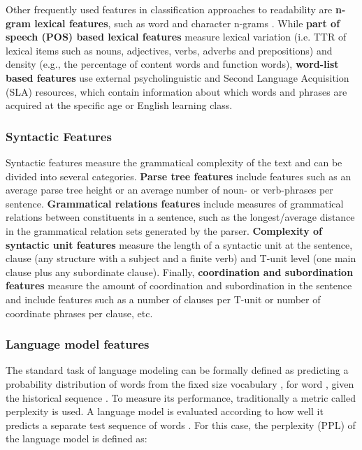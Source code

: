 \documentclass{clv3}
\begin{document}
Other frequently used features in classification approaches to readability are \textbf{n-gram lexical features}, such as word and character n-grams \citep{vajjala2012improving, xia2016text}. While \textbf{part of speech (POS) based lexical features} measure lexical variation (i.e. TTR of lexical items such as nouns, adjectives, verbs, adverbs and prepositions) and density (e.g., the percentage of content words and function words), \textbf{word-list based features} use external psycholinguistic and Second  Language Acquisition (SLA) resources, which contain information about which words and phrases are acquired at the specific age or English learning class. 


\subsubsection{Syntactic Features}

Syntactic features measure the grammatical complexity of the text and can be divided into several categories. \textbf{Parse tree features} include features such as an average parse tree height or an average number of noun- or verb-phrases per sentence. \textbf{Grammatical relations features} include measures of grammatical relations between constituents in a sentence, such as the longest/average distance in the grammatical relation sets generated by the parser. \textbf{Complexity of syntactic unit features} measure the length of a syntactic unit at the sentence, clause (any structure with a subject and a finite verb) and T-unit level (one main clause plus any subordinate clause). Finally, \textbf{coordination and subordination features} measure the amount of coordination and subordination in the sentence and include features such as a number of clauses per T-unit or number of coordinate phrases per clause, etc.


\subsubsection{Language model features}
\label{sec:LMs}
The standard task of language modeling can be formally defined as predicting a probability distribution of words from the fixed size vocabulary , for word , given the historical sequence . To measure its performance, traditionally a metric called perplexity is used. A language model  is evaluated according to how well it predicts a separate test sequence of words . For this case, the perplexity (PPL) of the language model  is defined as:
\end{document}
